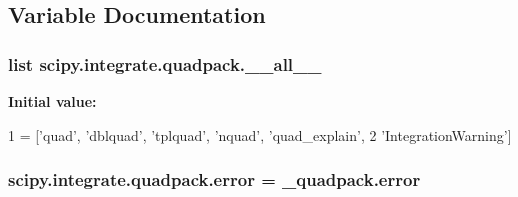 \subsection{Variable Documentation}
\hypertarget{namespacescipy_1_1integrate_1_1quadpack_a4af6ab2f0ad1ccff86bcc4e4bbd5066e}{}
\subsubsection[{\+\_\+\+\_\+all\+\_\+\+\_\+}]{\setlength{\rightskip}{0pt plus 5cm}list scipy.\+integrate.\+quadpack.\+\_\+\+\_\+all\+\_\+\+\_\+}\label{namespacescipy_1_1integrate_1_1quadpack_a4af6ab2f0ad1ccff86bcc4e4bbd5066e}
{\bfseries Initial value\+:}
\begin{DoxyCode}
1 = [\textcolor{stringliteral}{'quad'}, \textcolor{stringliteral}{'dblquad'}, \textcolor{stringliteral}{'tplquad'}, \textcolor{stringliteral}{'nquad'}, \textcolor{stringliteral}{'quad\_explain'},
2            \textcolor{stringliteral}{'IntegrationWarning'}]
\end{DoxyCode}
\hypertarget{namespacescipy_1_1integrate_1_1quadpack_a8ebc8a6d8ca779f95551f445cd6f5b0e}{}
\subsubsection[{error}]{\setlength{\rightskip}{0pt plus 5cm}scipy.\+integrate.\+quadpack.\+error = \+\_\+quadpack.\+error}\label{namespacescipy_1_1integrate_1_1quadpack_a8ebc8a6d8ca779f95551f445cd6f5b0e}
